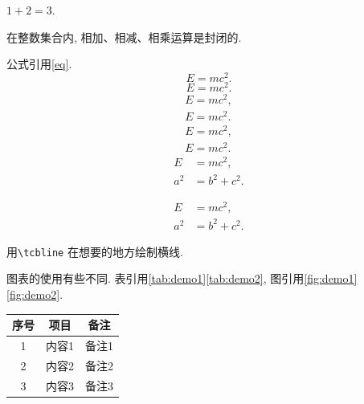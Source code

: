 \documentclass[type=proposal, twoside, AutoFakeBold=3.17,AutoFakeSlant=0.2,a4paper,openany]{gdufe_master}
\begin{document}
\begin{tcolorbox}[proposalBoxStyle]
    \begin{example}
        $1+2=3$.
    \end{example}

    \begin{corollary}
        在整数集合内, 相加、相减、相乘运算是封闭的.
    \end{corollary}

    公式引用\ref{eq}.
    \begin{equation}
        E=mc^2. \label{eq}
    \end{equation}
    \begin{equation*}
        E=mc^2.
    \end{equation*}
    \begin{gather}
        E=mc^2,\\
        E=mc^2.
    \end{gather}
    \begin{gather*}
        E=mc^2,\\
        E=mc^2.
    \end{gather*}
    \begin{align}
        E   & =mc^2,    \\
        a^2 & =b^2+c^2.
    \end{align}

    \begin{equation}
        \begin{aligned}
            E   & =mc^2,    \\
            a^2 & =b^2+c^2.
        \end{aligned}
    \end{equation}

    用\verb|\tcbline| 在想要的地方绘制横线.

    图表的使用有些不同. 表引用\ref{tab:demo1}\ref{tab:demo2}, 图引用\ref{fig:demo1}\ref{fig:demo2}.
    \begin{center}
        \label{tab:demo1}
        \begin{tabular}{ccc}
            \toprule
            序号 & 项目  & 备注  \\
            \midrule
            1  & 内容1 & 备注1 \\

            2  & 内容2 & 备注2 \\

            3  & 内容3 & 备注3 \\
            \bottomrule
        \end{tabular}
    \end{center}


\end{tcolorbox}
\end{document}
